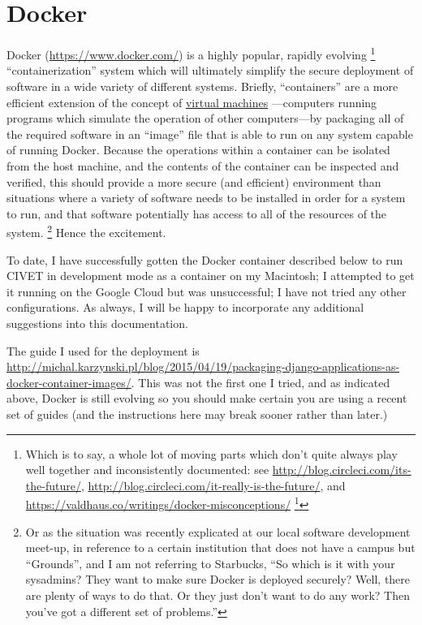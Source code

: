 \documentclass[letterpaper,10pt,english]{sphinxmanual}
\begin{document}
\section{Docker}
\label{appendix5:docker}
Docker (\href{https://www.docker.com/}{https://www.docker.com/}) is a highly popular, rapidly evolving \footnote{
Which is to say, a whole lot of moving parts which don't quite always play well together and inconsistently documented:
see   \href{http://blog.circleci.com/its-the-future/}{http://blog.circleci.com/its-the-future/},
\href{http://blog.circleci.com/it-really-is-the-future/}{http://blog.circleci.com/it-really-is-the-future/}, and \href{https://valdhaus.co/writings/docker-misconceptions/}{https://valdhaus.co/writings/docker-misconceptions/} \footnote{
Thanks to John Beieler for the links.
}
} “containerization” system which will ultimately simplify the secure deployment
of software in a wide variety of different systems. Briefly, “containers” are a more efficient extension of the concept of
\href{https://en.wikipedia.org/wiki/Virtual\_machine}{virtual machines} —computers running programs which simulate the operation
of other computers—by packaging all of the required software in an “image” file that is able to run on any system capable of
running Docker. Because the operations within a container can be isolated from the host machine, and the contents of the
container can be inspected and verified, this should provide a more secure (and efficient) environment than situations where
a variety of software
needs to be installed in order for a system to run, and that software potentially has access to all of the resources of the system. \footnote{
Or as the situation was recently explicated at our local software development meet-up, in reference
to a certain institution that does not have a campus but “Grounds”, and I am not referring to Starbucks, “So which
is it with your sysadmins? They want to make sure Docker is deployed securely? Well, there are plenty of ways to do
that. Or they just don't want to do any work? Then you've got a different set of problems.”
}
Hence the excitement.

To date, I have successfully gotten the Docker container described below to run CIVET in development mode as a container on my
Macintosh; I attempted to get it running on the Google Cloud but was unsuccessful; I have not tried any other configurations.
As always, I will be happy to incorporate any additional suggestions into this documentation.

The guide I used for the deployment is \href{http://michal.karzynski.pl/blog/2015/04/19/packaging-django-applications-as-docker-container-images/}{http://michal.karzynski.pl/blog/2015/04/19/packaging-django-applications-as-docker-container-images/}.
This was not the first one I tried, and as indicated above, Docker is still evolving
so you should make certain you are using a recent set of guides (and the instructions here may break sooner rather than
later.)
\end{document}
